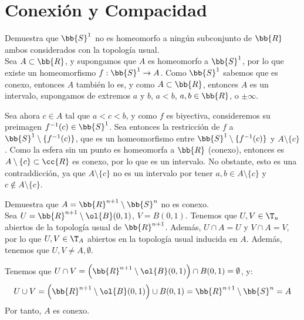 \section{Conexión y Compacidad}\label{sec:Rel3}

\begin{ejercicio}
Demuestra que $ \bb{S}^1 $ no es homeomorfo a ningún subconjunto de $ \bb{R} $ ambos considerados con la topología usual.\\


    Sea $A\subset \bb{R}$, y supongamos que $A$ es homeomorfo a $\bb{S}^1$, por lo que existe un homeomorfismo $f:\bb{S}^1 \to A$.
    Como $\bb{S}^1$ sabemos que es conexo, entonces $A$ también lo es, y como $A\subset \bb{R}$, entonces $A$ es un intervalo, supongamos de extremos
    $a$ y $b$, $a<b$, $a,b\in \bb{R}$, o $\pm \infty$.

    Sea ahora $c\in A$ tal que $a<c<b$, y como $f$ es biyectiva, consideremos su preimagen $f^{-1}(c)\in \bb{S}^1$.
    Sea entonces la restricción de $f$ a $\bb{S}^1\setminus \{f^{-1}(c)\}$,
    que es un homeomorfismo entre $\bb{S}^1\setminus \{f^{-1}(c)\}$ y $A\setminus \{c\}$. Como la esfera sin un punto es homeomorfa a $\bb{R}$ (conexo),
    entonces es $A\setminus \{c\}\subset \cc{R}$ es conexo, por lo que es un intervalo. No obstante, esto es una contraddicción,
    ya que $A\setminus \{c\}$ no es un intervalo por tener $a,b\in A\setminus \{c\}$ y $c\notin A\setminus \{c\}$.

\end{ejercicio}

\begin{ejercicio}
Demuestra que $ A=\bb{R}^{n+1} \setminus \bb{S}^n $ no es conexo.\\

    Sea $U=\bb{R}^{n+1}\setminus \ol{B}(0,1)$, $V=B(0,1)$. Tenemos que $U,V\in \T_u$ abiertos de la topología usual de $\bb{R}^{n+1}$.
    Además, $U\cap A=U$ y $V\cap A=V$, por lo que $U,V\in \T_A$ abiertos en la topología usual inducida en $A$. Además, tenemos que $U,V\neq A,\emptyset$.

    Tenemos que $U\cap V=\left(\bb{R}^{n+1}\setminus \ol{B}(0,1)\right) \cap B(0,1)=\emptyset$, y:
    \begin{equation*}
        U\cup V
        = \left(\bb{R}^{n+1}\setminus \ol{B}(0,1)\right) \cup B(0,1)
        = \bb{R}^{n+1} \setminus \bb{S}^n
        = A
    \end{equation*}
    Por tanto, $A$ es conexo.

\end{ejercicio}

